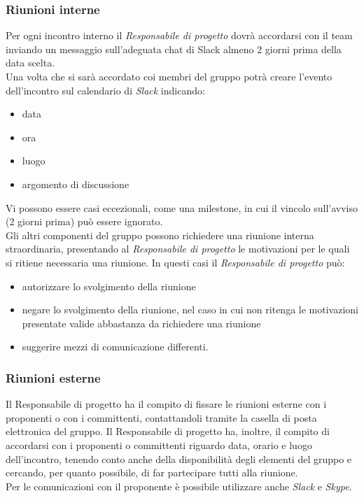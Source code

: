 \subsubsection{Riunioni interne}
Per ogni incontro interno il \emph{ \emph{Responsabile}  di progetto} dovrà
accordarsi con il team inviando un messaggio sull'adeguata chat di
Slack almeno 2 giorni prima della data scelta.\\ 
Una volta che si sarà accordato coi membri del gruppo potrà creare l'evento dell'incontro sul calendario di \emph{Slack} indicando:
\begin{itemize}
	\item data\item ora \item luogo\item argomento di discussione
\end{itemize}
Vi possono essere casi eccezionali, come una milestone, in cui il vincolo sull'avviso (2 giorni prima) può essere ignorato.\\
Gli altri componenti del gruppo possono richiedere una riunione
interna straordinaria, presentando al \emph{ \emph{Responsabile}  di
	progetto} le motivazioni per le quali si ritiene necessaria una
riunione. In questi casi il \emph{ \emph{Responsabile}  di progetto} può: 
\begin{itemize}
	\item autorizzare lo svolgimento della riunione
	\item negare lo
	svolgimento della riunione, nel caso in cui non ritenga le 
	motivazioni presentate valide abbastanza da richiedere una
	riunione
	\item suggerire mezzi di comunicazione differenti. 
\end{itemize}

\subsubsection{Riunioni esterne}
Il Responsabile di progetto ha il compito di fissare le riunioni esterne con i proponenti o con i
committenti, contattandoli tramite la casella di posta elettronica del gruppo.
Il Responsabile di progetto ha, inoltre, il compito di accordarsi con i proponenti o committenti riguardo data, orario e luogo dell’incontro, tenendo conto anche della disponibilità degli elementi del gruppo e cercando, per quanto possibile, di far partecipare tutti alla riunione. \\
Per le comunicazioni con il proponente è possibile utilizzare anche \emph{Slack} e \emph{Skype}.


